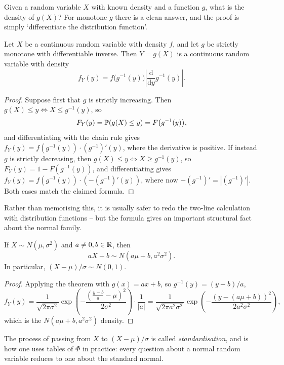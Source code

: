 \documentclass[a4paper]{scrartcl}
\begin{document}
Given a random variable $X$ with known density and a function $g$, what is the density of $g(X)$? For monotone $g$ there is a clean answer, and the proof is simply `differentiate the distribution function'.

\begin{theorem}
	Let $X$ be a continuous random variable with density $f$, and let $g$ be strictly monotone with differentiable inverse. Then $Y = g(X)$ is a continuous random variable with density
	$$
	f_Y(y) = f\big(g^{-1}(y)\big) \left|\frac{\mathrm{d}}{\mathrm{d}y} g^{-1}(y)\right|.
	$$
\end{theorem}
\begin{proof}
	Suppose first that $g$ is strictly increasing. Then $g(X) \leq y \iff X \leq g^{-1}(y)$, so
	$$
	F_Y(y) = \mathbb{P}(g(X) \leq y) = F\big(g^{-1}(y)\big),
	$$
	and differentiating with the chain rule gives $f_Y(y) = f(g^{-1}(y)) \cdot (g^{-1})'(y)$, where the derivative is positive. If instead $g$ is strictly decreasing, then $g(X) \leq y \iff X \geq g^{-1}(y)$, so $F_Y(y) = 1 - F(g^{-1}(y))$, and differentiating gives $f_Y(y) = f(g^{-1}(y)) \cdot \left(-(g^{-1})'(y)\right)$, where now $-(g^{-1})' = |(g^{-1})'|$. Both cases match the claimed formula.
\end{proof}

Rather than memorising this, it is usually safer to redo the two-line calculation with distribution functions -- but the formula gives an important structural fact about the normal family.

\begin{corollary}
	If $X \sim N(\mu, \sigma^2)$ and $a \neq 0, b \in \mathbb{R}$, then
	$$
	aX + b \sim N(a\mu + b, a^2\sigma^2).
	$$
	In particular, $(X - \mu)/\sigma \sim N(0,1)$.
\end{corollary}
\begin{proof}
	Applying the theorem with $g(x) = ax + b$, so $g^{-1}(y) = (y - b)/a$,
	$$
	f_Y(y) = \frac{1}{\sqrt{2\pi\sigma^2}}\exp\left(-\frac{(\frac{y - b}{a} - \mu)^2}{2\sigma^2}\right)\cdot\frac{1}{|a|} = \frac{1}{\sqrt{2\pi a^2\sigma^2}}\exp\left(-\frac{(y - (a\mu + b))^2}{2a^2\sigma^2}\right),
	$$
	which is the $N(a\mu + b, a^2\sigma^2)$ density.
\end{proof}

The process of passing from $X$ to $(X - \mu)/\sigma$ is called \emph{standardisation}, and is how one uses tables of $\Phi$ in practice: every question about a normal random variable reduces to one about the standard normal.
\end{document}
